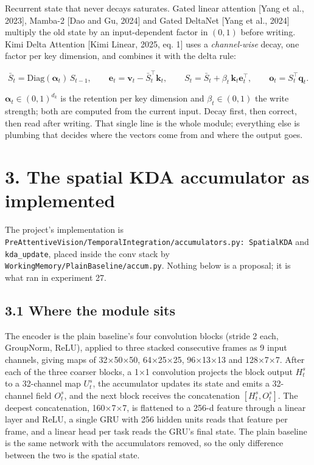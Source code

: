 \documentclass[

]{article}
\begin{document}
Recurrent state that never decays saturates. Gated linear attention {[}Yang et al., 2023{]}, Mamba-2 {[}Dao and Gu, 2024{]} and Gated DeltaNet {[}Yang et al., 2024{]} multiply the old state by an input-dependent factor in \((0,1)\) before writing. Kimi Delta Attention {[}Kimi Linear, 2025, eq. 1{]} uses a \emph{channel-wise} decay, one factor per key dimension, and combines it with the delta rule:



\[

\bar S_t=\mathrm{Diag}(\boldsymbol\alpha_t)\,S_{t-1},\qquad

\mathbf{e}_t=\mathbf{v}_t-\bar S_t^\top\mathbf{k}_t,\qquad

S_t=\bar S_t+\beta_t\,\mathbf{k}_t\mathbf{e}_t^\top,\qquad

\mathbf{o}_t=S_t^\top\mathbf{q}_t .

\]



\(\boldsymbol\alpha_t\in(0,1)^{d_k}\) is the retention per key dimension and \(\beta_t\in(0,1)\) the write strength; both are computed from the current input. Decay first, then correct, then read after writing. That single line is the whole module; everything else is plumbing that decides where the vectors come from and where the output goes.



\section{3. The spatial KDA accumulator as implemented}\label{the-spatial-kda-accumulator-as-implemented}



The project's implementation is \texttt{PreAttentiveVision/TemporalIntegration/accumulators.py:\ SpatialKDA} and \texttt{kda\_update}, placed inside the conv stack by \texttt{WorkingMemory/PlainBaseline/accum.py}. Nothing below is a proposal; it is what ran in experiment 27.



\subsection{3.1 Where the module sits}\label{where-the-module-sits}



The encoder is the plain baseline's four convolution blocks (stride 2 each, GroupNorm, ReLU), applied to three stacked consecutive frames as 9 input channels, giving maps of 32×50×50, 64×25×25, 96×13×13 and 128×7×7. After each of the three coarser blocks, a 1×1 convolution projects the block output \(H^s_t\) to a 32-channel map \(U^s_t\), the accumulator updates its state and emits a 32-channel field \(O^s_t\), and the next block receives the concatenation \([H^s_t, O^s_t]\). The deepest concatenation, 160×7×7, is flattened to a 256-d feature through a linear layer and ReLU, a single GRU with 256 hidden units reads that feature per frame, and a linear head per task reads the GRU's final state. The plain baseline is the same network with the accumulators removed, so the only difference between the two is the spatial state.
\end{document}
